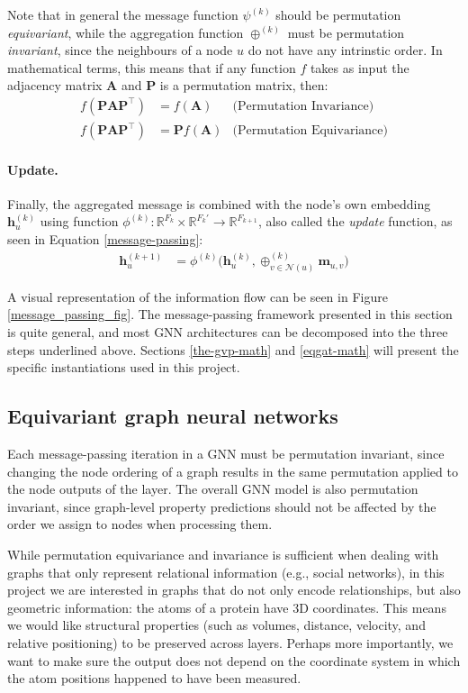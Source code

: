 Note that in general the message function $\psi^{(k)}$ should be permutation \textit{equivariant}, while the aggregation function $\oplus^{(k)}$ must be permutation \textit{invariant}, since the neighbours of a node $u$ do not have any intrinstic order. In mathematical terms, this means that if any function $f$ takes as input the adjacency matrix $\mathbf{A}$ and $\mathbf{P}$ is a permutation matrix, then:
\begin{align}
    f(\mathbf{PAP}^{\top}) &= f(\mathbf{A}) &\text{(Permutation Invariance)} \\
    f(\mathbf{PAP}^{\top}) &= \mathbf{P}f(\mathbf{A}) &\text{(Permutation Equivariance)}
\end{align}

\paragraph{Update.}
Finally, the aggregated message is combined with the node's own embedding $\mathbf{h}_u^{(k)}$ using function $\phi^{(k)}:\mathbb{R}^{F_k} \times \mathbb{R}^{F_{k}'} \rightarrow \mathbb{R}^{F_{k+1}}$, also called the \textit{update} function, as seen in Equation \ref{message-passing}:
\begin{align}
    \textbf{h}_u^{(k+1)} &= \phi^{(k)}\Big(\textbf{h}_u^{(k)}, \oplus_{v\in \mathcal{N}(u)}^{(k)}\mathbf{m}_{u,v}\Big)
\label{message-passing}
\end{align}

A visual representation of the information flow can be seen in Figure \ref{message_passing_fig}. The message-passing framework presented in this section is quite general, and most GNN architectures can be decomposed into the three steps underlined above. Sections \ref{the-gvp-math} and \ref{eqgat-math} will present the specific instantiations used in this project. 

\subsection{Equivariant graph neural networks}

Each message-passing iteration in a GNN must be permutation invariant, since changing the node ordering of a graph results in the same permutation applied to the node outputs of the layer. 
The overall GNN model is also permutation invariant, since graph-level property predictions should not be affected by the order we assign to nodes when processing them.

While permutation equivariance and invariance is sufficient when dealing with graphs that only represent relational information (e.g., social networks), in this project we are interested in graphs that do not only encode relationships, but also geometric information: the atoms of a protein have 3D coordinates. This means we would like structural properties (such as volumes, distance, velocity, and relative positioning) to be preserved across layers. Perhaps more importantly, we want to make sure the output does not depend on the coordinate system in which the atom positions happened to have been measured.

